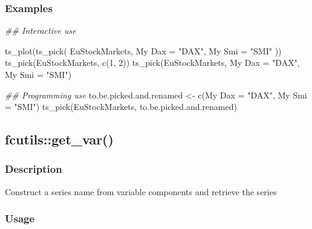 \documentclass[
  letterpaper,
  DIV=11,
  numbers=noendperiod]{scrreport}
\newenvironment{Shaded}{\begin{snugshade}}{\end{snugshade}}
\newcommand{\AttributeTok}[1]{\textcolor[rgb]{0.40,0.45,0.13}{#1}}
\newcommand{\DecValTok}[1]{\textcolor[rgb]{0.68,0.00,0.00}{#1}}
\newcommand{\DocumentationTok}[1]{\textcolor[rgb]{0.37,0.37,0.37}{\textit{#1}}}
\newcommand{\FunctionTok}[1]{\textcolor[rgb]{0.28,0.35,0.67}{#1}}
\newcommand{\NormalTok}[1]{\textcolor[rgb]{0.00,0.23,0.31}{#1}}
\newcommand{\OtherTok}[1]{\textcolor[rgb]{0.00,0.23,0.31}{#1}}
\newcommand{\StringTok}[1]{\textcolor[rgb]{0.13,0.47,0.30}{#1}}
\begin{document}
\subsubsection{Examples}\label{examples-57}

\begin{Shaded}
\begin{Highlighting}[]
\DocumentationTok{\#\# Interactive use}

\FunctionTok{ts\_plot}\NormalTok{(}\FunctionTok{ts\_pick}\NormalTok{(}
\NormalTok{  EuStockMarkets,}
  \StringTok{\textasciigrave{}}\AttributeTok{My Dax}\StringTok{\textasciigrave{}} \OtherTok{=} \StringTok{"DAX"}\NormalTok{,}
  \StringTok{\textasciigrave{}}\AttributeTok{My Smi}\StringTok{\textasciigrave{}} \OtherTok{=} \StringTok{"SMI"}
\NormalTok{))}
\FunctionTok{ts\_pick}\NormalTok{(EuStockMarkets, }\FunctionTok{c}\NormalTok{(}\DecValTok{1}\NormalTok{, }\DecValTok{2}\NormalTok{))}
\FunctionTok{ts\_pick}\NormalTok{(EuStockMarkets, }\StringTok{\textasciigrave{}}\AttributeTok{My Dax}\StringTok{\textasciigrave{}} \OtherTok{=} \StringTok{"DAX"}\NormalTok{, }\StringTok{\textasciigrave{}}\AttributeTok{My Smi}\StringTok{\textasciigrave{}} \OtherTok{=} \StringTok{"SMI"}\NormalTok{)}

\DocumentationTok{\#\# Programming use}
\NormalTok{to.be.picked.and.renamed }\OtherTok{\textless{}{-}} \FunctionTok{c}\NormalTok{(}\StringTok{\textasciigrave{}}\AttributeTok{My Dax}\StringTok{\textasciigrave{}} \OtherTok{=} \StringTok{"DAX"}\NormalTok{, }\StringTok{\textasciigrave{}}\AttributeTok{My Smi}\StringTok{\textasciigrave{}} \OtherTok{=} \StringTok{"SMI"}\NormalTok{)}
\FunctionTok{ts\_pick}\NormalTok{(EuStockMarkets, to.be.picked.and.renamed)}
\end{Highlighting}
\end{Shaded}

\subsection{fcutils::get\_var()}\label{fcutilsget_var}

\subsubsection{Description}\label{description-58}

Construct a series name from variable components and retrieve the series

\subsubsection{Usage}\label{usage-58}
\end{document}
